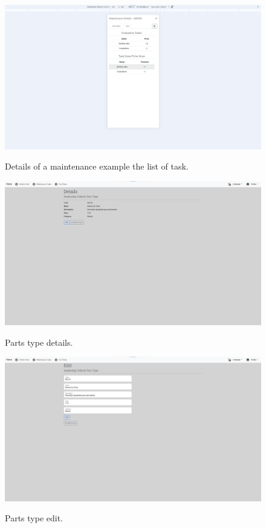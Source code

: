 \begin{figure}[htbp]
  \caption{Details of a maintenance example the list of task.}
  \centering
  \includegraphics[width=\textwidth]{figs/Implementation/client/MaintenanceDetailsTasks}
  \label{fig:MaintenanceDetailsTasks}
\end{figure}




\begin{figure}[htbp]
  \caption{Parts type details.}
  \centering
  \includegraphics[width=\textwidth]{figs/Implementation/dealershipAdmin/partsDetails}
  \label{fig:partsDetails}
\end{figure}

\begin{figure}[htbp]
  \caption{Parts type edit.}
  \centering
  \includegraphics[width=\textwidth]{figs/Implementation/dealershipAdmin/partsEdit}
  \label{fig:partsEdit}
\end{figure}

